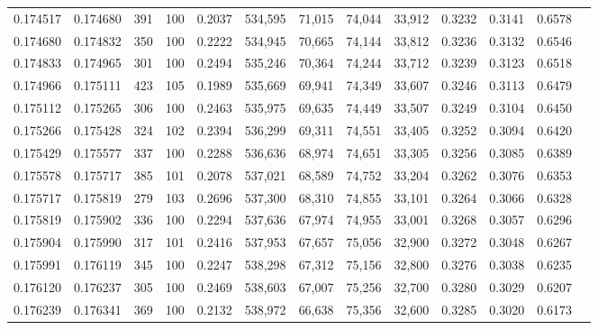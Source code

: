 \begin{tabular}{rrrrrrrrrrrrr}
0.174517 & 0.174680 &   391 & 100 &                                     0.2037 & 534,595 &  71,015 &  74,044 &  33,912 & 0.3232 & 0.3141 & 0.6578 \\
0.174680 & 0.174832 &   350 & 100 &                                     0.2222 & 534,945 &  70,665 &  74,144 &  33,812 & 0.3236 & 0.3132 & 0.6546 \\
0.174833 & 0.174965 &   301 & 100 &                                     0.2494 & 535,246 &  70,364 &  74,244 &  33,712 & 0.3239 & 0.3123 & 0.6518 \\
0.174966 & 0.175111 &   423 & 105 &                                     0.1989 & 535,669 &  69,941 &  74,349 &  33,607 & 0.3246 & 0.3113 & 0.6479 \\
0.175112 & 0.175265 &   306 & 100 &                                     0.2463 & 535,975 &  69,635 &  74,449 &  33,507 & 0.3249 & 0.3104 & 0.6450 \\
0.175266 & 0.175428 &   324 & 102 &                                     0.2394 & 536,299 &  69,311 &  74,551 &  33,405 & 0.3252 & 0.3094 & 0.6420 \\
0.175429 & 0.175577 &   337 & 100 &                                     0.2288 & 536,636 &  68,974 &  74,651 &  33,305 & 0.3256 & 0.3085 & 0.6389 \\
0.175578 & 0.175717 &   385 & 101 &                                     0.2078 & 537,021 &  68,589 &  74,752 &  33,204 & 0.3262 & 0.3076 & 0.6353 \\
0.175717 & 0.175819 &   279 & 103 &                                     0.2696 & 537,300 &  68,310 &  74,855 &  33,101 & 0.3264 & 0.3066 & 0.6328 \\
0.175819 & 0.175902 &   336 & 100 &                                     0.2294 & 537,636 &  67,974 &  74,955 &  33,001 & 0.3268 & 0.3057 & 0.6296 \\
0.175904 & 0.175990 &   317 & 101 &                                     0.2416 & 537,953 &  67,657 &  75,056 &  32,900 & 0.3272 & 0.3048 & 0.6267 \\
0.175991 & 0.176119 &   345 & 100 &                                     0.2247 & 538,298 &  67,312 &  75,156 &  32,800 & 0.3276 & 0.3038 & 0.6235 \\
0.176120 & 0.176237 &   305 & 100 &                                     0.2469 & 538,603 &  67,007 &  75,256 &  32,700 & 0.3280 & 0.3029 & 0.6207 \\
0.176239 & 0.176341 &   369 & 100 &                                     0.2132 & 538,972 &  66,638 &  75,356 &  32,600 & 0.3285 & 0.3020 & 0.6173 \\

\end{tabular}
